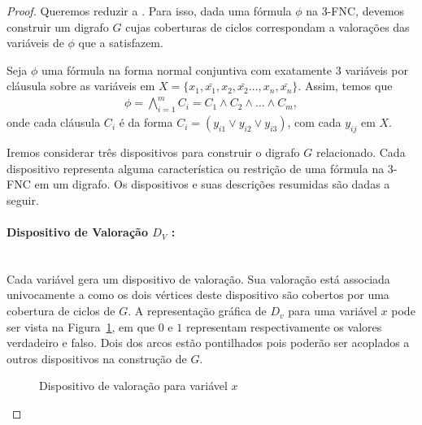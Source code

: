 \documentclass[paper=a4, fontsize=11pt]{scrartcl} %
\numberwithin{equation}{section} %
\numberwithin{figure}{section} %
\numberwithin{table}{section} %
\numberwithin{definition}{section}
\numberwithin{theorem}{section}
\newcommand{\prob}[1]{\text{\textsc{\textbf{#1}}}}
\begin{document}
\begin{proof}

Queremos reduzir \prob{\#3sat} a \prob{permanente}. Para isso, dada uma fórmula $\phi$ na 3-FNC, devemos construir um digrafo $ G $ cujas coberturas de ciclos correspondam a valorações das variáveis de $\phi$ que a satisfazem.

Seja $\phi$ uma fórmula na forma normal conjuntiva com exatamente 3 variáveis por cláusula sobre as variáveis em $ X = \{x_1, \bar{x_1}, x_2, \bar{x_2} \dots, x_n, \bar{x_n} \} $. Assim, temos que
\begin{align*}
\phi = \bigwedge\limits_{i = 1}^{m}C_i = C_1 \land C_2 \land \dots \land C_m,
\end{align*}
onde cada cláusula $C_i$ é da forma $C_i = (y_{i1} \lor y_{i2} \lor y_{i3} )$, com cada $y_{ij}$ em $X$.

Iremos considerar três dispositivos para construir o digrafo $ G $ relacionado. Cada dispositivo representa alguma característica ou restrição de uma fórmula na 3-FNC em um digrafo. Os dispositivos e suas descrições resumidas são dadas a seguir.

\paragraph{Dispositivo de Valoração $D_V$ :} \hfill \\

      Cada variável gera um dispositivo de valoração. Sua valoração está associada univocamente a como os dois vértices deste dispositivo são cobertos por uma cobertura de ciclos de $G$. A representação gráfica de $D_v$ para uma variável $x$ pode ser vista na Figura~\ref{fig:Dv}, em que $0$ e $1$ representam respectivamente os valores verdadeiro e falso. Dois dos arcos estão pontilhados pois poderão ser acoplados a outros dispositivos na construção de $G$.
      
\FloatBarrier
\begin{figure}
\centering
{}
\caption{Dispositivo de valoração para variável $x$}
\label{fig:Dv}
\end{figure}


\end{proof}
\end{document}
